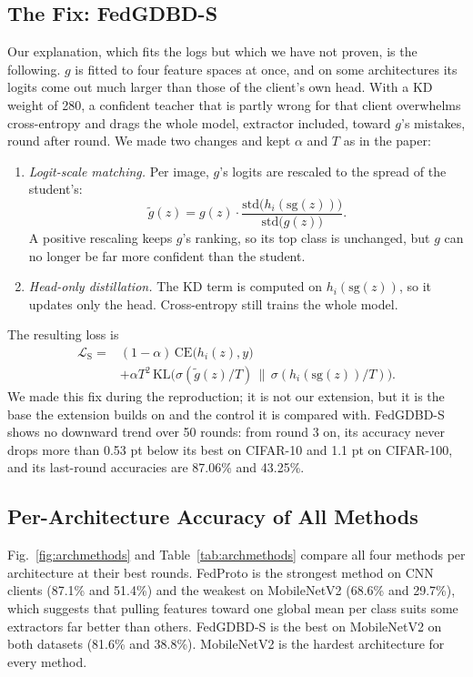 \documentclass[conference]{IEEEtran}
\begin{document}
\subsection{The Fix: FedGDBD-S}
\label{sec:fix}
Our explanation, which fits the logs but which we have not proven, is the following. $g$ is fitted to four feature spaces at once, and on some architectures its logits come out much larger than those of the client's own head. With a KD weight of 280, a confident teacher that is partly wrong for that client overwhelms cross-entropy and drags the whole model, extractor included, toward $g$'s mistakes, round after round. We made two changes and kept $\alpha$ and $T$ as in the paper:
\begin{enumerate}
\item \textit{Logit-scale matching.} Per image, $g$'s logits are rescaled to the spread of the student's:
\begin{equation}
\tilde{g}(z) = g(z)\cdot \frac{\mathrm{std}\big(h_i(\mathrm{sg}(z))\big)}{\mathrm{std}\big(g(z)\big)}.
\label{eq:scale}
\end{equation}
A positive rescaling keeps $g$'s ranking, so its top class is unchanged, but $g$ can no longer be far more confident than the student.
\item \textit{Head-only distillation.} The KD term is computed on $h_i(\mathrm{sg}(z))$, so it updates only the head. Cross-entropy still trains the whole model.
\end{enumerate}
The resulting loss is
\begin{equation}
\begin{split}
\mathcal{L}_{\text{S}} = {}&(1-\alpha)\,\mathrm{CE}\big(h_i(z),y\big)\\
&+ \alpha T^2\,\mathrm{KL}\big(\sigma(\tilde{g}(z)/T)\,\big\|\,\sigma(h_i(\mathrm{sg}(z))/T)\big).
\end{split}
\label{eq:fgs}
\end{equation}
We made this fix during the reproduction; it is not our extension, but it is the base the extension builds on and the control it is compared with. FedGDBD-S shows no downward trend over 50 rounds: from round 3 on, its accuracy never drops more than 0.53 pt below its best on CIFAR-10 and 1.1 pt on CIFAR-100, and its last-round accuracies are 87.06\% and 43.25\%.

\subsection{Per-Architecture Accuracy of All Methods}
Fig.~\ref{fig:archmethods} and Table~\ref{tab:archmethods} compare all four methods per architecture at their best rounds. FedProto is the strongest method on CNN clients (87.1\% and 51.4\%) and the weakest on MobileNetV2 (68.6\% and 29.7\%), which suggests that pulling features toward one global mean per class suits some extractors far better than others. FedGDBD-S is the best on MobileNetV2 on both datasets (81.6\% and 38.8\%). MobileNetV2 is the hardest architecture for every method.
\end{document}
